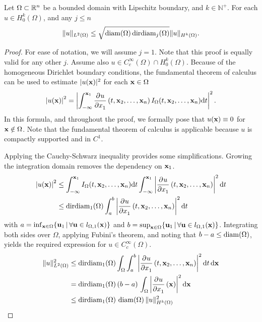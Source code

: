 \begin{lemma}
  \label{lem:friederichs_like}
  Let $\Omega \subset \mathbb{R}^n$ be a bounded domain with Lipschitz boundary, and $k \in \mathbb{N}^{+}$. For each $u \in H_0^k(\Omega)$, and any $j \leq n$
  \begin{equation}
    \label{equ:friederichs_like}
    \| u \|_{L^2(\Omega)} \leq \sqrt{\operatorname{diam}(\Omega) \operatorname{dirdiam}_j(\Omega)} \| u \|_{H^k(\Omega)} \text{.}
  \end{equation}
\end{lemma}
\begin{proof}
  For ease of notation, we will assume $j = 1$. Note that this proof is equally valid for any other $j$. Assume also $u \in C^\infty_c(\Omega) \cap H_0^k(\Omega)$. Because of the homogeneous Dirichlet boundary conditions,
  the fundamental theorem of calculus can be used to estimate $|u(\vb{x})|^2$ for each $\vb{x} \in \Omega$
  $$
    \left|u(\vb{x})\right|^2 = \left|\int_{-\infty}^{\vb{x}_1} \pdv[]{u}{x_1}\left(t, \vb{x}_2, \dots, \vb{x}_{n}\right)I_\Omega(t,\vb{x}_2, \dots, \vb{x}_n)\dd t\right|^2 \text{.}
  $$
  In this formula, and throughout the proof, we formally pose that $u(\vb{x}) \equiv 0$ for $\vb{x} \notin \Omega$. Note that the fundamental theorem of calculus is applicable because $u$ is compactly supported and in $C^1$.

  Applying the Cauchy-Schwarz inequality provides some simplifications. Growing the integration domain removes the dependency on $\vb{x}_1$.
  \begin{align*}
    \left|u(\vb{x})\right|^2 & \leq \int_{-\infty}^{\vb{x}_1} I_\Omega(t,\vb{x}_2, \dots, \vb{x}_n) \dd t \int_{-\infty}^{\vb{x}_1} \left|\pdv[]{u}{x_1}\left(t,\vb{x}_2, \dots, \vb{x}_n\right)\right|^2\dd t \\
                             & \leq \operatorname{dirdiam}_1(\Omega) \int_{a}^{b} \left|\pdv[]{u}{x_1}\left(t,\vb{x}_2, \dots, \vb{x}_n\right)\right|^2\dd t
  \end{align*}
  with $a = \inf_{\vb{x} \in \Omega}\{\vb{u}_1 \,|\, \forall \vb{u} \in l_{\Omega, 1}(\vb{x})\}$ and $b = \sup_{\vb{x} \in \Omega}\{\vb{u}_1 \,|\, \forall \vb{u} \in l_{\Omega, 1}(\vb{x})\}$. Integrating both sides over $\Omega$, applying Fubini's theorem, and noting that $b - a \leq \operatorname{diam}(\Omega)$, yields the required expression for $u \in C^\infty_c(\Omega)$.
  \begin{align*}
    \|u\|_{L^2(\Omega)}^2 & \leq \operatorname{dirdiam}_1(\Omega) \int_\Omega \int_{a}^{b} \left|\pdv[]{u}{x_1}\left(t, \vb{x}_2, \dots, \vb{x}_{n}\right)\right|^2\dd t \, \dd \vb{x} \\
                          & = \operatorname{dirdiam}_1(\Omega) \, (b - a) \, \int_{\Omega} \left|\pdv[]{u}{x_1}\left(\vb{x}\right)\right|^2 \dd \vb{x}                              \\
                          & \leq \operatorname{dirdiam}_1(\Omega) \, \operatorname{diam}(\Omega) \, \| u \|^2_{H^k(\Omega)}
  \end{align*}


\end{proof}
